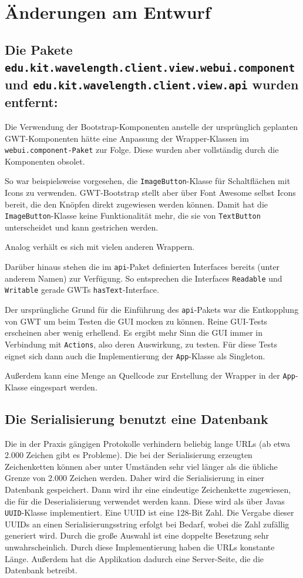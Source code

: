 \documentclass[parskip=full,11pt]{scrartcl}
\begin{document}
\section{Änderungen am Entwurf}

\subsection[Entfernte Pakete]{Die Pakete \texttt{edu.kit.wavelength.client.view.webui.component} und \texttt{edu.kit.wavelength.client.view.api} wurden entfernt:}

Die Verwendung der Bootstrap-Komponenten anstelle der ursprünglich geplanten GWT-Komponenten hätte eine Anpassung der Wrapper-Klassen im \texttt{webui.component-Paket} zur Folge.
Diese wurden aber vollständig durch die Komponenten obsolet.

So war beispielsweise vorgesehen, die \texttt{ImageButton}-Klasse für Schaltflächen mit Icons zu verwenden.
GWT-Bootstrap stellt aber über Font Awesome selbst Icons bereit, die den Knöpfen direkt zugewiesen werden können.
Damit hat die \texttt{ImageButton}-Klasse keine Funktionalität mehr, die sie von \texttt{TextButton} unterscheidet und kann gestrichen werden.

Analog verhält es sich mit vielen anderen Wrappern.

Darüber hinaus stehen die im \texttt{api}-Paket definierten Interfaces bereits (unter anderem Namen) zur Verfügung.
So entsprechen die Interfaces \texttt{Readable} und \texttt{Writable} gerade GWTs \texttt{hasText}-Interface.

Der ursprüngliche Grund für die Einführung des \texttt{api}-Pakets war die Entkopplung von GWT um beim Testen die GUI mocken zu können.
Reine GUI-Tests erscheinen aber wenig erhellend.
Es ergibt mehr Sinn die GUI immer in Verbindung mit \texttt{Actions}, also deren Auswirkung, zu testen.
Für diese Tests eignet sich dann auch die Implementierung der \texttt{App}-Klasse als Singleton.

Außerdem kann eine Menge an Quellcode zur Erstellung der Wrapper in der \texttt{App}-Klasse eingespart werden.

\subsection{Die Serialisierung benutzt eine Datenbank}
Die in der Praxis gängigen Protokolle verhindern beliebig lange URLs (ab etwa 2.000 Zeichen gibt es Probleme).
Die bei der Serialisierung erzeugten Zeichenketten können aber unter Umständen sehr viel länger als die übliche Grenze von 2.000 Zeichen werden.
Daher wird die Serialisierung in einer Datenbank gespeichert.
Dann wird ihr eine eindeutige Zeichenkette zugewiesen, die für die Deserialisierung verwendet werden kann.
Diese wird als über Javas \texttt{UUID}-Klasse implementiert.
Eine UUID ist eine 128-Bit Zahl.
Die Vergabe dieser UUIDs an einen Serialisierungsstring erfolgt bei Bedarf, wobei die Zahl zufällig generiert wird.
Durch die große Auswahl ist eine doppelte Besetzung sehr unwahrscheinlich.
Durch diese Implementierung haben die URLs konstante Länge.
Außerdem hat die Applikation dadurch eine Server-Seite, die die Datenbank betreibt.
\end{document}
